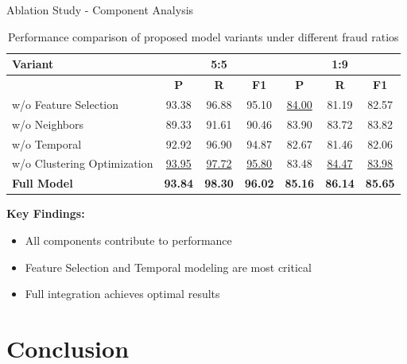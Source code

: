 \documentclass{beamer}
\begin{document}
\begin{frame}{Ablation Study - Component Analysis}
    \begin{table}
        \centering
        \tiny
        \caption{Performance comparison of proposed model variants under different fraud ratios}
        \begin{tabular}{lccc|ccc}
            \hline
            \textbf{Variant} & \multicolumn{3}{c|}{\textbf{5:5}} & \multicolumn{3}{c}{\textbf{1:9}} \\
            \hline
             & \textbf{P} & \textbf{R} & \textbf{F1} & \textbf{P} & \textbf{R} & \textbf{F1} \\
            \hline
            w/o Feature Selection & 93.38 & 96.88 & 95.10 & \underline{84.00} & 81.19 & 82.57 \\
            w/o Neighbors & 89.33 & 91.61 & 90.46 & 83.90 & 83.72 & 83.82 \\
            w/o Temporal & 92.92 & 96.90 & 94.87 & 82.67 & 81.46 & 82.06 \\
            w/o Clustering Optimization & \underline{93.95} & \underline{97.72} & \underline{95.80} & 83.48 & \underline{84.47} & \underline{83.98} \\
            \textbf{Full Model} & \textbf{93.84} & \textbf{98.30} & \textbf{96.02} & \textbf{85.16} & \textbf{86.14} & \textbf{85.65} \\
            \hline
        \end{tabular}
    \end{table}
    
    \vspace{0.3cm}
    \textbf{Key Findings:}
    \begin{itemize}
        \item All components contribute to performance
        \item Feature Selection and Temporal modeling are most critical
        \item Full integration achieves optimal results
    \end{itemize}
\end{frame}

\section{Conclusion}
\end{document}
